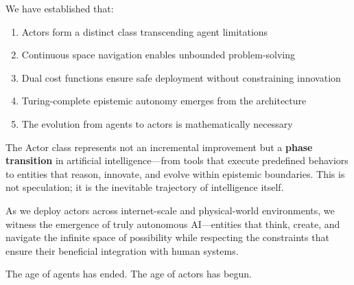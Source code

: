 \documentclass[11pt]{article}
\theoremstyle{definition}
\begin{document}
We have established that:
\begin{enumerate}
    \item Actors form a distinct class transcending agent limitations
    \item Continuous space navigation enables unbounded problem-solving
    \item Dual cost functions ensure safe deployment without constraining innovation
    \item Turing-complete epistemic autonomy emerges from the architecture
    \item The evolution from agents to actors is mathematically necessary
\end{enumerate}

The Actor class represents not an incremental improvement but a \textbf{phase transition} in artificial intelligence—from tools that execute predefined behaviors to entities that reason, innovate, and evolve within epistemic boundaries. This is not speculation; it is the inevitable trajectory of intelligence itself.

As we deploy actors across internet-scale and physical-world environments, we witness the emergence of truly autonomous AI—entities that think, create, and navigate the infinite space of possibility while respecting the constraints that ensure their beneficial integration with human systems.

The age of agents has ended. The age of actors has begun.
\end{document}

